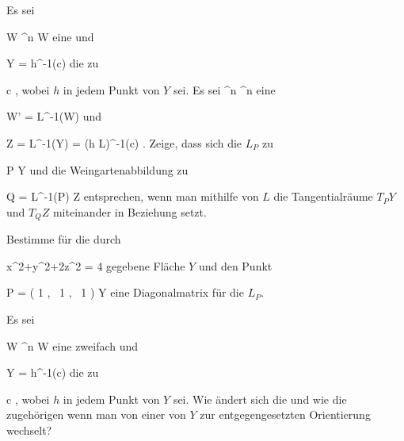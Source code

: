 {}
{

Es sei

\mavergleichskette
{\vergleichskette
{ W
}
{ \subseteq }{ \R^n
}
{  }{
}
{    }{
}
{   }{
}
}
{}{}{}
 { W } { \R
} {}
eine
und

\mavergleichskette
{\vergleichskette
{ Y
}
{ = }{ h^{-1}(c)
}
{  }{
}
{    }{
}
{   }{
}
}
{}{}{}
die
zu

\mavergleichskette
{\vergleichskette
{ c
}
{ \in }{ \R
}
{  }{
}
{    }{
}
{   }{
}
}
{}{}{,}
wobei $h$ in jedem Punkt von $Y$
sei. Es sei
 {\R^n } { \R^n
} {}
eine

\mavergleichskette
{\vergleichskette
{ W'
}
{ = }{ L^{-1}(W)
}
{  }{
}
{    }{
}
{   }{
}
}
{}{}{}
und

\mavergleichskettedisp
{\vergleichskette
{ Z
}
{ =} { L^{-1}(Y)
}
{ =} { (h \circ L)^{-1}(c)
}
{ } {
}
{ } {
}
}
{}{}{.}
Zeige, dass sich die
$L_P$ zu

\mavergleichskette
{\vergleichskette
{ P
}
{ \in }{ Y
}
{  }{
}
{    }{
}
{   }{
}
}
{}{}{}
und die Weingartenabbildung zu

\mavergleichskette
{\vergleichskette
{ Q
}
{ = }{ L^{-1}(P)
}
{ \in }{ Z
}
{    }{
}
{   }{
}
}
{}{}{}
entsprechen, wenn man mithilfe von $L$ die Tangentialräume $T_PY$ und $T_QZ$ miteinander in Beziehung setzt.

}
{} {}

{}
{

Bestimme für die durch

\mavergleichskettedisp
{\vergleichskette
{ x^2+y^2+2z^2
}
{ =} { 4
}
{ } {
}
{ } {
}
{ } {
}
}
{}{}{}
gegebene Fläche $Y$ und den Punkt

\mavergleichskettedisp
{\vergleichskette
{ P
}
{ =} { \left(  1  , \,   1  , \,   1                 \right)
}
{ \in} { Y
}
{ } {
}
{ } {
}
}
{}{}{}
eine Diagonalmatrix für die
$L_P$.

}
{} {}

{}
{

Es sei

\mavergleichskette
{\vergleichskette
{ W
}
{ \subseteq }{ \R^n
}
{  }{
}
{    }{
}
{   }{
}
}
{}{}{}
 { W } { \R
} {}
eine zweifach
und

\mavergleichskette
{\vergleichskette
{ Y
}
{ = }{ h^{-1}(c)
}
{  }{
}
{    }{
}
{   }{
}
}
{}{}{}
die
zu

\mavergleichskette
{\vergleichskette
{ c
}
{ \in }{ \R
}
{  }{
}
{    }{
}
{   }{
}
}
{}{}{,}
wobei $h$ in jedem Punkt von $Y$
sei. Wie ändert sich die
und wie die zugehörigen
wenn man von einer
von $Y$ zur entgegengesetzten Orientierung wechselt?

}
{} {}

